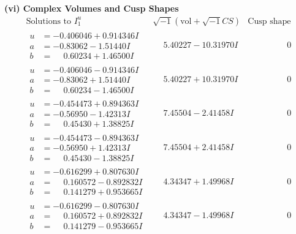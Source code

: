 \documentclass[1p]{elsarticle_modified}
\theoremstyle{definition}
\newcommand{\I}{\sqrt{-1}}
\begin{document}
\newpage\flushleft \textbf{(vi) Complex Volumes and Cusp Shapes}
$$\begin{array}{c|c|c}  
\text{Solutions to }I^u_{1}& \I (\text{vol} + \sqrt{-1}CS) & \text{Cusp shape}\\
 \hline 
\begin{aligned}
u &= -0.406046 + 0.914346 I \\
a &= -0.83062 - 1.51440 I \\
b &= \phantom{-}0.60234 + 1.46500 I\end{aligned}
 & \phantom{-}5.40227 - 10.31970 I & \phantom{-0.000000 } 0 \\ \hline\begin{aligned}
u &= -0.406046 - 0.914346 I \\
a &= -0.83062 + 1.51440 I \\
b &= \phantom{-}0.60234 - 1.46500 I\end{aligned}
 & \phantom{-}5.40227 + 10.31970 I & \phantom{-0.000000 } 0 \\ \hline\begin{aligned}
u &= -0.454473 + 0.894363 I \\
a &= -0.56950 - 1.42313 I \\
b &= \phantom{-}0.45430 + 1.38825 I\end{aligned}
 & \phantom{-}7.45504 - 2.41458 I & \phantom{-0.000000 } 0 \\ \hline\begin{aligned}
u &= -0.454473 - 0.894363 I \\
a &= -0.56950 + 1.42313 I \\
b &= \phantom{-}0.45430 - 1.38825 I\end{aligned}
 & \phantom{-}7.45504 + 2.41458 I & \phantom{-0.000000 } 0 \\ \hline\begin{aligned}
u &= -0.616299 + 0.807630 I \\
a &= \phantom{-}0.160572 - 0.892832 I \\
b &= \phantom{-}0.141279 + 0.953665 I\end{aligned}
 & \phantom{-}4.34347 + 1.49968 I & \phantom{-0.000000 } 0 \\ \hline\begin{aligned}
u &= -0.616299 - 0.807630 I \\
a &= \phantom{-}0.160572 + 0.892832 I \\
b &= \phantom{-}0.141279 - 0.953665 I\end{aligned}
 & \phantom{-}4.34347 - 1.49968 I & \phantom{-0.000000 } 0 \\ \hline\begin{aligned}

\end{aligned}
\end{array}$$
\end{document}
